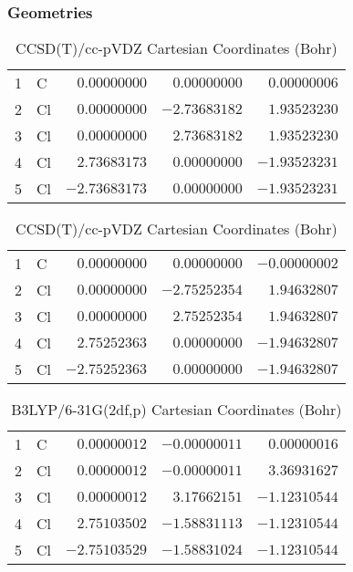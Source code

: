 \documentclass[10pt,oneside]{article}
\begin{document}
\begin{table}[h!]
\subsubsection*{Geometries}
\begin{multicols}{2}
\centering
\caption{CCSD(T)/cc-pVTZ Cartesian Coordinates (Bohr)}
\begin{tabular}{llrrr}
\toprule
1  & C  & $ 0.00000000$ & $ 0.00000000$ & $ 0.00000006$ \\
2  & Cl & $ 0.00000000$ & $-2.73683182$ & $ 1.93523230$ \\
3  & Cl & $ 0.00000000$ & $ 2.73683182$ & $ 1.93523230$ \\
4  & Cl & $ 2.73683173$ & $ 0.00000000$ & $-1.93523231$ \\
5  & Cl & $-2.73683173$ & $ 0.00000000$ & $-1.93523231$ \\
\bottomrule
\end{tabular}
\caption{CCSD(T)/cc-pVDZ Cartesian Coordinates (Bohr)}
\begin{tabular}{llrrr}
\toprule
1  & C  & $ 0.00000000$ & $ 0.00000000$ & $-0.00000002$ \\
2  & Cl & $ 0.00000000$ & $-2.75252354$ & $ 1.94632807$ \\
3  & Cl & $ 0.00000000$ & $ 2.75252354$ & $ 1.94632807$ \\
4  & Cl & $ 2.75252363$ & $ 0.00000000$ & $-1.94632807$ \\
5  & Cl & $-2.75252363$ & $ 0.00000000$ & $-1.94632807$ \\
\bottomrule
\end{tabular}
\end{multicols}
\end{table}

\begin{table}[h]
\centering
\caption{B3LYP/6-31G(2df,p) Cartesian Coordinates (Bohr)}
\begin{tabular}{llrrr}
\toprule
1  & C  & $ 0.00000012$ & $-0.00000011$ & $ 0.00000016$ \\
2  & Cl & $ 0.00000012$ & $-0.00000011$ & $ 3.36931627$ \\
3  & Cl & $ 0.00000012$ & $ 3.17662151$ & $-1.12310544$ \\
4  & Cl & $ 2.75103502$ & $-1.58831113$ & $-1.12310544$ \\
5  & Cl & $-2.75103529$ & $-1.58831024$ & $-1.12310544$ \\
\bottomrule
\end{tabular}
\end{table}
\end{document}
